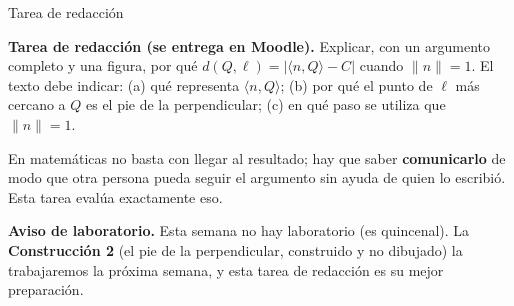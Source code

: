 \documentclass[aspectratio=169,10pt]{beamer}
\newcommand{\destaca}[1]{%
  \par\vspace{3pt}\noindent
  \colorbox{turquesaClaro}{%
    \parbox{\dimexpr\linewidth-2\fboxsep\relax}{\vspace{3pt}#1\vspace{3pt}}}%
  \par\vspace{3pt}}
\newcommand{\pp}[2]{\langle #1,#2\rangle}
\newcommand{\norma}[1]{\lVert #1\rVert}
\begin{document}
\begin{frame}{Tarea de redacción}
  \destaca{\textbf{Tarea de redacción (se entrega en Moodle).}
  Explicar, con un argumento completo y una figura, por qué
  $d(Q,\ell)=|\pp{n}{Q}-C|$ cuando $\norma{n}=1$. El texto debe
  indicar: (a) qué representa $\pp{n}{Q}$; (b) por qué el punto de
  $\ell$ más cercano a $Q$ es el pie de la perpendicular; (c) en qué
  paso se utiliza que $\norma{n}=1$.}

  \vspace{0.3cm}
  En matemáticas no basta con llegar al resultado; hay que saber
  \textbf{comunicarlo} de modo que otra persona pueda seguir el
  argumento sin ayuda de quien lo escribió. Esta tarea evalúa
  exactamente eso.

  \vspace{0.3cm}
  \destaca{\small \textbf{Aviso de laboratorio.} Esta semana no hay
  laboratorio (es quincenal). La \textbf{Construcción 2} (el pie de
  la perpendicular, construido y no dibujado) la trabajaremos la
  próxima semana, y esta tarea de redacción es su mejor preparación.}
\end{frame}
\end{document}
